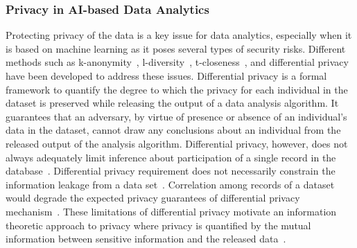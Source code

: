 \documentclass[a4paper,11pt]{article}
\begin{document}
\subsubsection{Privacy in AI-based Data Analytics}
\label{sect:privacy}
Protecting privacy of the data is a key issue for data analytics, especially when it is based on machine learning as it poses several types of security risks. Different methods such as k-anonymity~\cite{10.1142/S0218488502001648}, l-diversity~\cite{10.1145/1217299.1217302}, t-closeness~\cite{DBLP:conf/icde/LiLV07}, and differential privacy~\cite{10.1561/0400000042} have been developed to address these issues. Differential privacy is a formal framework to quantify the degree to which the privacy for each individual in the dataset is preserved while releasing the output of a data analysis algorithm. It guarantees that an adversary, by virtue of presence or absence of an individual's data in the dataset, cannot draw any conclusions about an individual from the released output of the analysis algorithm. Differential privacy, however, does not always adequately limit inference about participation of a single record in the database~\cite{10.1145/1989323.1989345}. Differential privacy requirement does not necessarily constrain the information leakage from a data set~\cite{Calmon_privacyagainst}. Correlation among records of a dataset would degrade the expected privacy guarantees of differential privacy mechanism~\cite{DBLP:conf/ndss/LiuMC16}. These limitations of differential privacy motivate an information theoretic approach to privacy where privacy is quantified by the mutual information between sensitive information and the released data~\cite{5288525,Calmon_privacyagainst,6482222,7888175,DBLP:journals/corr/abs-1710-09295}. 

%
\end{document}
